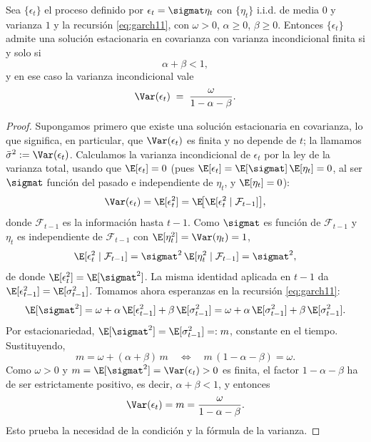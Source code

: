 \begin{teorema}
\label{teo:garch-estac}
Sea $\{\epsilon_t\}$ el proceso definido por $\epsilon_t = \sigmat \eta_t$ con $\{\eta_t\}$ i.i.d. de media $0$ y varianza $1$ y la recursión \eqref{eq:garch11}, con $\omega > 0$, $\alpha \ge 0$, $\beta \ge 0$. Entonces $\{\epsilon_t\}$ admite una solución estacionaria en covarianza con varianza incondicional finita si y solo si
\[
\alpha + \beta < 1,
\]
y en ese caso la varianza incondicional vale
\[
\Var(\epsilon_t) \;=\; \frac{\omega}{1 - \alpha - \beta}.
\]
\end{teorema}

\begin{proof}
Supongamos primero que existe una solución estacionaria en covarianza, lo que significa, en particular, que $\Var(\epsilon_t)$ es finita y no depende de $t$; la llamamos $\bar{\sigma}^2 := \Var(\epsilon_t)$. Calculamos la varianza incondicional de $\epsilon_t$ por la ley de la varianza total, usando que $\E[\epsilon_t] = 0$ (pues $\E[\epsilon_t] = \E[\sigmat]\,\E[\eta_t] = 0$, al ser $\sigmat$ función del pasado e independiente de $\eta_t$, y $\E[\eta_t]=0$):
\[
\Var(\epsilon_t) = \E[\epsilon_t^2] = \E\!\big[\E[\epsilon_t^2 \mid \mathcal{F}_{t-1}]\big],
\]
donde $\mathcal{F}_{t-1}$ es la información hasta $t-1$. Como $\sigmat$ es función de $\mathcal{F}_{t-1}$ y $\eta_t$ es independiente de $\mathcal{F}_{t-1}$ con $\E[\eta_t^2] = \Var(\eta_t) = 1$,
\[
\E[\epsilon_t^2 \mid \mathcal{F}_{t-1}] = \sigmat^2\, \E[\eta_t^2 \mid \mathcal{F}_{t-1}] = \sigmat^2,
\]
de donde $\E[\epsilon_t^2] = \E[\sigmat^2]$. La misma identidad aplicada en $t-1$ da $\E[\epsilon_{t-1}^2] = \E[\sigma_{t-1}^2]$. Tomamos ahora esperanzas en la recursión \eqref{eq:garch11}:
\[
\E[\sigmat^2] = \omega + \alpha\, \E[\epsilon_{t-1}^2] + \beta\, \E[\sigma_{t-1}^2]
= \omega + \alpha\, \E[\sigma_{t-1}^2] + \beta\, \E[\sigma_{t-1}^2].
\]
Por estacionariedad, $\E[\sigmat^2] = \E[\sigma_{t-1}^2] =: m$, constante en el tiempo. Sustituyendo,
\[
m = \omega + (\alpha + \beta)\, m
\quad\Longleftrightarrow\quad
m\,(1 - \alpha - \beta) = \omega.
\]
Como $\omega > 0$ y $m = \E[\sigmat^2] = \Var(\epsilon_t) > 0$ es finita, el factor $1 - \alpha - \beta$ ha de ser estrictamente positivo, es decir, $\alpha + \beta < 1$, y entonces
\[
\Var(\epsilon_t) = m = \frac{\omega}{1 - \alpha - \beta}.
\]
Esto prueba la necesidad de la condición y la fórmula de la varianza.


\end{proof}

